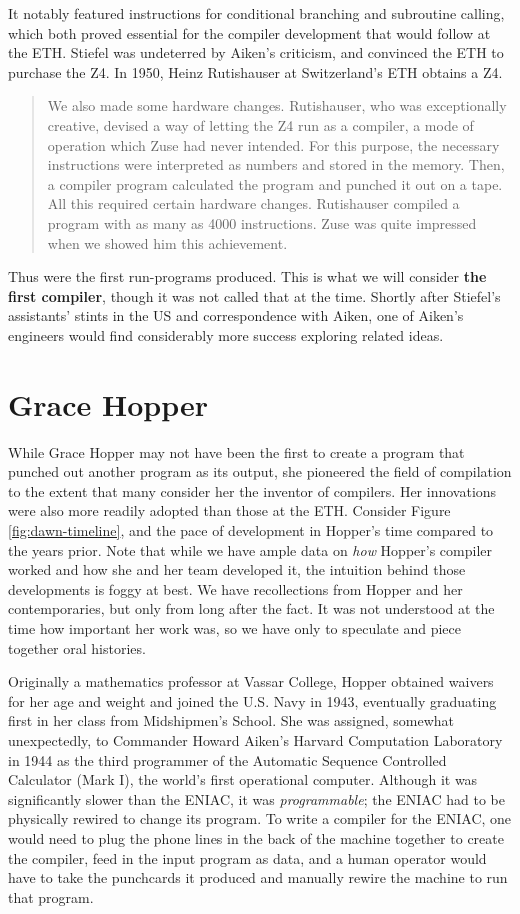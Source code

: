 It notably featured instructions for conditional branching and subroutine calling, which
both proved essential for the compiler development that would follow at the ETH.
Stiefel was undeterred by Aiken's criticism, and convinced the ETH to purchase the Z4.
In 1950, Heinz Rutishauser at Switzerland's ETH obtains a Z4.

\begin{quotation}
We also made some hardware changes. Rutishauser, who was exceptionally creative, devised a way of
letting the Z4 run as a compiler, a mode of operation which Zuse had never intended. For this purpose, the
necessary instructions were interpreted as numbers and stored in the memory. Then, a compiler program
calculated the program and punched it out on a tape. All this required certain hardware changes. Rutishauser
compiled a program with as many as 4000 instructions. Zuse was quite impressed when we showed him this
achievement.\cite{konrad-zuses-z4-2000}
\end{quotation}

Thus were the first run-programs produced.
This is what we will consider \textbf{the first compiler}, though it was not called that at the time.
Shortly after Stiefel's assistants' stints in the US and correspondence with Aiken,
one of Aiken's engineers would find considerably more success exploring related ideas.

\section{Grace Hopper}

While Grace Hopper may not have been the first to create a program that
punched out another program as its output, she pioneered the field of
compilation to the extent that many consider her the inventor of compilers.
Her innovations were also more readily adopted than those at the ETH.
Consider Figure \ref{fig:dawn-timeline}, and the pace of development in Hopper's time
compared to the years prior.
Note that while we have ample data on \textit{how} Hopper's compiler worked and how
she and her team developed it, the intuition behind those developments is foggy at best.
We have recollections from Hopper and her contemporaries, but only from long after the fact.
It was not understood at the time how important her work was, so we have
only to speculate and piece together oral histories.

Originally a mathematics professor at Vassar College, Hopper obtained waivers for her age and weight and
joined the U.S. Navy in 1943, eventually graduating first in her class from Midshipmen's School.
She was assigned, somewhat unexpectedly, to Commander Howard Aiken's Harvard Computation Laboratory in 1944
as the third programmer of the Automatic Sequence Controlled Calculator (Mark I), 
the world's first operational computer.
Although it was significantly slower than the ENIAC, it was \textit{programmable};
the ENIAC had to be physically rewired to change its program.
To write a compiler for the ENIAC, one would need to plug the phone lines in the back of the machine
together to create the compiler, feed in the input program as data, and a human operator would have
to take the punchcards it produced and manually rewire the machine to run that program.

